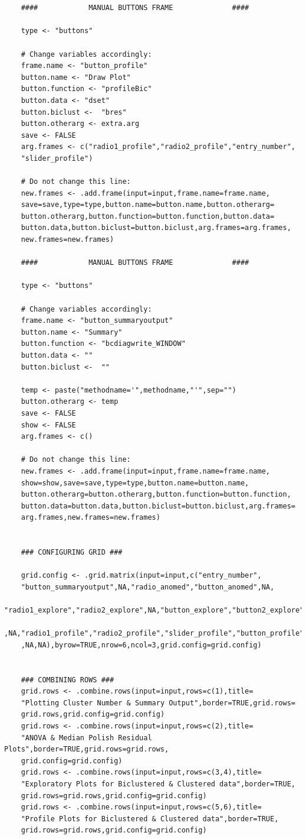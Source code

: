 \documentclass[a4paper]{article}\usepackage[]{graphicx}\usepackage[]{color}
\begin{document}
\begin{verbatim}
	
	
	####	    	MANUAL BUTTONS FRAME 			  ####
	
	type <- "buttons"
	
	# Change variables accordingly:
	frame.name <- "button_profile"  
	button.name <- "Draw Plot"  
	button.function <- "profileBic" 
	button.data <- "dset" 
	button.biclust <-  "bres" 
	button.otherarg <- extra.arg
	save <- FALSE
	arg.frames <- c("radio1_profile","radio2_profile","entry_number",
    "slider_profile") 
	
	# Do not change this line:
	new.frames <- .add.frame(input=input,frame.name=frame.name,
    save=save,type=type,button.name=button.name,button.otherarg=
    button.otherarg,button.function=button.function,button.data=
    button.data,button.biclust=button.biclust,arg.frames=arg.frames,
    new.frames=new.frames)
	
	####	    	MANUAL BUTTONS FRAME 			  ####
	
	type <- "buttons"
	
	# Change variables accordingly:
	frame.name <- "button_summaryoutput"  
	button.name <- "Summary"  
	button.function <- "bcdiagwrite_WINDOW" 
	button.data <- "" 
	button.biclust <-  ""
	
	temp <- paste("methodname='",methodname,"'",sep="")
	button.otherarg <- temp
	save <- FALSE
	show <- FALSE
	arg.frames <- c() 
	
	# Do not change this line:
	new.frames <- .add.frame(input=input,frame.name=frame.name,
    show=show,save=save,type=type,button.name=button.name,
    button.otherarg=button.otherarg,button.function=button.function,
    button.data=button.data,button.biclust=button.biclust,arg.frames=
    arg.frames,new.frames=new.frames)
		
	
	### CONFIGURING GRID ###
	
	grid.config <- .grid.matrix(input=input,c("entry_number",
    "button_summaryoutput",NA,"radio_anomed","button_anomed",NA,
    "radio1_explore","radio2_explore",NA,"button_explore","button2_explore"
    ,NA,"radio1_profile","radio2_profile","slider_profile","button_profile"
    ,NA,NA),byrow=TRUE,nrow=6,ncol=3,grid.config=grid.config)
	
	
	### COMBINING ROWS ###
	grid.rows <- .combine.rows(input=input,rows=c(1),title=
    "Plotting Cluster Number & Summary Output",border=TRUE,grid.rows=
    grid.rows,grid.config=grid.config)
	grid.rows <- .combine.rows(input=input,rows=c(2),title=
    "ANOVA & Median Polish Residual Plots",border=TRUE,grid.rows=grid.rows,
    grid.config=grid.config)
	grid.rows <- .combine.rows(input=input,rows=c(3,4),title=
    "Exploratory Plots for Biclustered & Clustered data",border=TRUE,
    grid.rows=grid.rows,grid.config=grid.config)
	grid.rows <- .combine.rows(input=input,rows=c(5,6),title=
    "Profile Plots for Biclustered & Clustered data",border=TRUE,
    grid.rows=grid.rows,grid.config=grid.config)
	

\end{verbatim}
\end{document}
